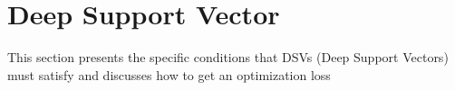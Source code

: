 \section{Deep Support Vector}\label{sec:DSV}


This section presents the specific conditions that DSVs (Deep Support Vectors) must satisfy and discusses how to get an optimization loss %





